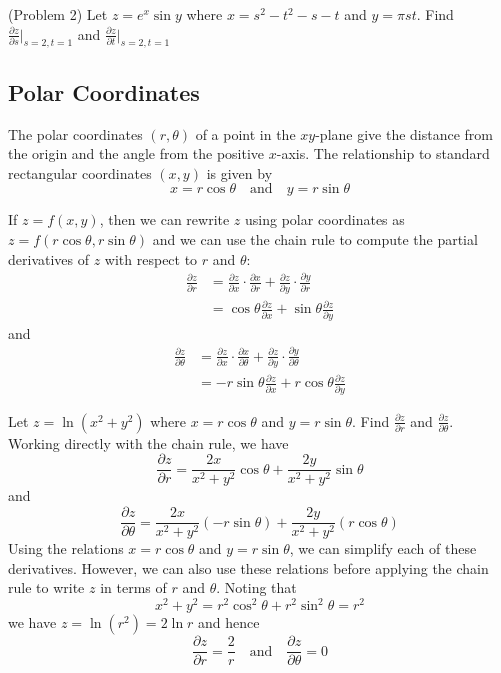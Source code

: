\documentclass[handout]{ximera}
\begin{document}
\begin{problem}(Problem 2)
Let $z = e^x \sin y$ where $x = s^2 - t^2 - s - t$ and $y = \pi st$. 
Find $\frac{\partial z}{\partial s}\bigg|_{s = 2, t = 1}$ and $\frac{\partial z}{\partial t}\bigg|_{s = 2, t = 1}$
\end{problem}

\subsection{Polar Coordinates}
The polar coordinates $(r, \theta)$ of a point in the $xy$-plane give the distance from the origin and the angle from the positive $x$-axis. 
The relationship to standard rectangular coordinates $(x,y)$ is given by
\[
x = r \cos \theta \quad \text{and} \quad y = r \sin \theta
\]

If $z = f(x,y)$, then we can rewrite $z$ using polar coordinates as $z = f(r\cos \theta, r \sin \theta)$ and we can use the chain rule to 
compute the partial derivatives of $z$ with respect to $r$ and $\theta$:
\begin{align*}
\frac{\partial z}{\partial r} &= \frac{\partial z}{\partial x} \cdot \frac{\partial x}{\partial r} + \frac{\partial z}{\partial y} \cdot \frac{\partial y}{\partial r}\\
                              &= \cos \theta \frac{\partial z}{\partial x} + \sin \theta \frac{\partial z}{\partial y}
\end{align*}
and
\begin{align*}
\frac{\partial z}{\partial \theta} &= \frac{\partial z}{\partial x} \cdot \frac{\partial x}{\partial \theta} 
                                      + \frac{\partial z}{\partial y} \cdot \frac{\partial y}{\partial \theta}\\
                              &= -r\sin \theta \frac{\partial z}{\partial x} + r \cos \theta \frac{\partial z}{\partial y}
\end{align*}


\begin{example}[Example 3]
Let $z = \ln(x^2 + y^2)$ where $x = r\cos \theta$ and $y = r\sin \theta$.  Find $\frac{\partial z}{\partial r}$ and $\frac{\partial z}{\partial \theta}$.\\
Working directly with the chain rule, we have
\[
\frac{\partial z}{\partial r} = \frac{2x}{x^2+y^2} \cos \theta + \frac{2y}{x^2+y^2} \sin \theta
\]
and
\[
\frac{\partial z}{\partial \theta} = \frac{2x}{x^2+y^2} (-r\sin \theta) + \frac{2y}{x^2+y^2} (r\cos \theta)
\]
Using the relations $x = r\cos \theta$ and $y = r\sin \theta$, we can simplify each of these derivatives.
However, we can also use these relations before applying the chain rule to write $z$ in terms of $r$ and $\theta$.
Noting that
\[
x^2 + y^2 = r^2 \cos^2 \theta + r^2 \sin^2 \theta = r^2
\]
we have $z = \ln(r^2) = 2\ln r$ and hence
\[
\frac{\partial z}{\partial r} = \frac{2}{r} \quad \text{and} \quad \frac{\partial z}{\partial \theta} = 0
\]
\end{example}
\end{document}
